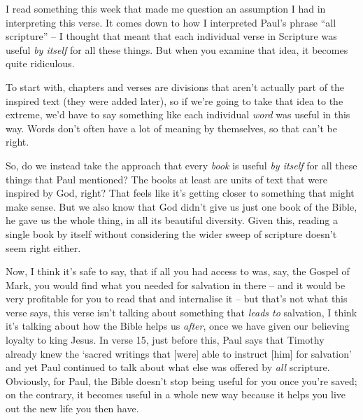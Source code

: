 I read something this week that made me question an assumption I had in
interpreting this verse. It comes down to how I interpreted Paul's phrase
\enquote{all scripture} -- I thought that meant that each individual verse in
Scripture was useful \textit{by itself} for all these things. But when you
examine that idea, it becomes quite ridiculous.

To start with, chapters and verses are divisions that aren't actually part of
the inspired text (they were added later), so if we're going to take that idea
to the extreme, we'd have to say something like each individual \textit{word}
was useful in this way.  Words don't often have a lot of meaning by themselves,
so that can't be right.

So, do we instead take the approach that every \textit{book} is useful
\textit{by itself} for all these things that Paul mentioned? The books at least
are units of text that were inspired by God, right? That feels like it's getting
closer to something that might make sense. But we also know that God didn't give
us just one book of the Bible, he gave us the whole thing, in all its beautiful
diversity. Given this, reading a single book by itself without considering the
wider sweep of scripture doesn't seem right either.

Now, I think it's safe to say, that if all you had access to was, say, the
Gospel of Mark, you would find what you needed for salvation in there -- and it
would be very profitable for you to read that and internalise it -- but that's
not what this verse says, this verse isn't talking about something that
\textit{leads to} salvation, I think it's talking about how the Bible helps us
\textit{after}, once we have given our believing loyalty to king Jesus. In verse
15, just before this, Paul says that Timothy already knew the `sacred writings
that [were] able to instruct [him] for salvation' and yet Paul continued to talk
about what else was offered by \textit{all} scripture. Obviously, for Paul, the
Bible doesn't stop being useful for you once you're saved; on the contrary, it
becomes useful in a whole new way because it helps you live out the new life you
then have.

